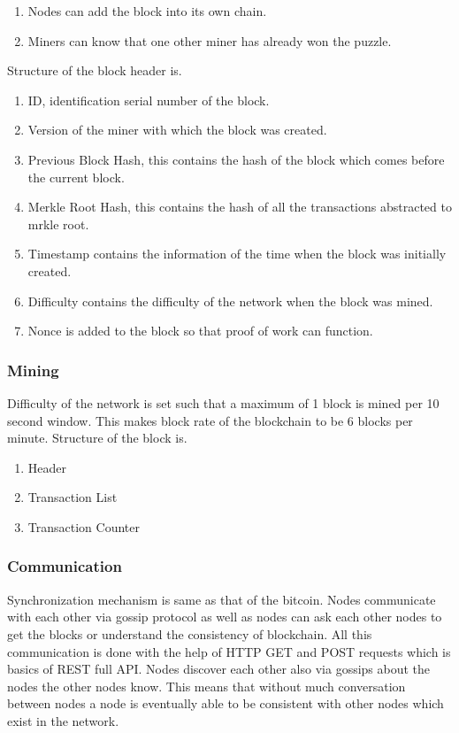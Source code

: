 \documentclass[conference]{IEEEtran}
\begin{document}
\begin{enumerate}[(1)]
	\item Nodes can add the block into its own chain. 
	
	\item Miners can know that one other miner has already won the puzzle. 
\end{enumerate}

Structure of the block header is. 
\begin{enumerate}[(1)]
	\item ID, identification serial number of the block. 
	
	\item Version of the miner with which the block was created. 
	
	\item Previous Block Hash, this contains the hash of the block which comes before the current block. 
	
	\item Merkle Root Hash, this contains the hash of all the transactions abstracted to mrkle root. 
	
	\item Timestamp contains the information of the time when the block was initially created. 
	
	\item Difficulty contains the difficulty of the network when the block was mined. 
	
	\item Nonce is added to the block so that proof of work can function. 
\end{enumerate}

\subsubsection{Mining}
Difficulty of the network is set such that a maximum of 1 block is mined per 10 second window. This makes block rate of the blockchain to be 6 blocks per minute. 	
Structure of the block is. 
\begin{enumerate}[(1)]
	\item Header 
	
	\item Transaction List 
	
	\item Transaction Counter
\end{enumerate}

\subsubsection{Communication}
Synchronization mechanism is same as that of the bitcoin. Nodes communicate with each other via gossip protocol as well as nodes can ask each other nodes to get the blocks or understand the consistency of blockchain. All this communication is done with the help of HTTP GET and POST requests which is basics of REST full API. Nodes discover each other also via gossips about the nodes the other nodes know. This means that without much conversation between nodes a node is eventually able to be consistent with other nodes which exist in the network. 
\end{document}
